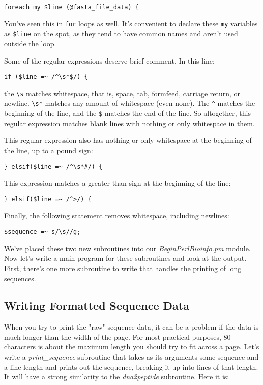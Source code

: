 \begin{lstlisting}
foreach my $line (@fasta_file_data) {
\end{lstlisting}

You've seen this in \verb|for| loops as well. It's convenient to declare these \verb|my| variables as \verb|$line| on the spot, as they tend to have common names and aren't used outside the loop.

Some of the regular expressions deserve brief comment. In this line: 

\begin{lstlisting}
if ($line =~ /^\s*$/) {
\end{lstlisting}

the \verb|\s| matches whitespace, that is, space, tab, formfeed, carriage return, or newline. \verb|\s*| matches any amount of whitespace (even none). The \verb|^| matches the beginning of the line, and the \verb|$| matches the end of the line. So altogether, this regular expression matches blank lines with nothing or only whitespace in them.

This regular expression also has nothing or only whitespace at the beginning of the line, up to a pound sign:

\begin{lstlisting}
} elsif($line =~ /^\s*#/) {
\end{lstlisting}

This expression matches a greater-than sign at the beginning of the line:

\begin{lstlisting}
} elsif($line =~ /^>/) {
\end{lstlisting}

Finally, the following statement removes whitespace, including newlines:

\begin{lstlisting}
$sequence =~ s/\s//g;
\end{lstlisting}

We've placed these two new subroutines into our \textit{BeginPerlBioinfo.pm} module. Now let's write a main program for these subroutines and look at the output. First, there's one more subroutine to write that handles the printing of long sequences. 

\subsection{Writing Formatted Sequence Data}
When you try to print the "raw" sequence data, it can be a problem if the data is much longer than the width of the page. For most practical purposes, 80 characters is about the maximum length you should try to fit across a page. Let's write a \textit{print\_sequence} subroutine that takes as its arguments some sequence and a line length and prints out the sequence, breaking it up into lines of that length. It will have a strong similarity to the \textit{dna2peptide} subroutine. Here it is: 

